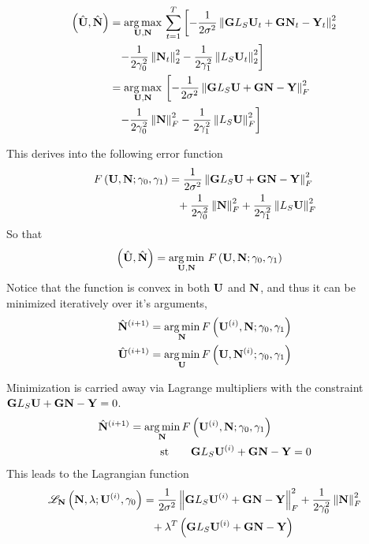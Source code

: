 \documentclass[progressbar=head]{beamer}
\begin{document}
\begin{frame}
\begin{align*}
\left(  \hat{\mathbf{U}}, \hat{\mathbf{N}}  \right) 
&=
    \operatorname*{arg\,max}_{\mathbf{U}, \mathbf{N} }\, \sum_{t=1}^T  \left[
    -\frac{1}{2\sigma^2}
    \left\lVert \mathbf{G} L_S \mathbf{U}_t + \mathbf{G} \mathbf{N}_t - \mathbf{Y}_t \right\rVert_2^2
    \right.
    \\
    &\phantom{=}
    \left.
    -
    \frac{1}{2\gamma_0^2} \left\lVert \mathbf{N}_t \right\rVert_2^2
    -
    \frac{1}{2\gamma_1^2} \left\lVert L_S \mathbf{U}_t \right\rVert_2^2
    \right]
    \\
    &=
    \operatorname*{arg\,max}_{\mathbf{U}, \mathbf{N} }\, \left[
    -\frac{1}{2\sigma^2}
    \left\lVert \mathbf{G} L_S \mathbf{U} + \mathbf{G} \mathbf{N} - \mathbf{Y} \right\rVert_F^2
    \right.
    \\
    &\phantom{=}
    \left.
    -
    \frac{1}{2\gamma_0^2} \left\lVert \mathbf{N} \right\rVert_F^2
    -
    \frac{1}{2\gamma_1^2} \left\lVert L_S \mathbf{U} \right\rVert_F^2
    \right]
\end{align*}
\end{frame}

\begin{frame}
This derives into the following error function
\begin{align*}
    F\left(  {\mathbf{U}}, {\mathbf{N}};  \gamma_0, \gamma_1 \right) &=
    \frac{1}{2\sigma^2}
    \left\lVert \mathbf{G} L_S \mathbf{U} + \mathbf{G} \mathbf{N} - \mathbf{Y} \right\rVert_F^2
    \nonumber \\
    &\phantom{=}
    +
    \frac{1}{2\gamma_0^2} \left\lVert \mathbf{N} \right\rVert_F^2
    +
    \frac{1}{2\gamma_1^2} \left\lVert L_S \mathbf{U} \right\rVert_F^2
\end{align*}
So that
\begin{align*}
\left(  \hat{\mathbf{U}}, \hat{\mathbf{N}}  \right) 
&=
    \operatorname*{arg\,min}_{\mathbf{U}, \mathbf{N} }\, F\left(  {\mathbf{U}}, {\mathbf{N}};  \gamma_0, \gamma_1 \right)
\end{align*}
Notice that the function is convex in both $\mathbf{U}$ and $\mathbf{N}$, and thus it can be minimized iteratively over it's arguments,
    \begin{align*}
        \hat{\mathbf{N}}^{(i+1)} &= \operatorname*{arg\,min}_{\mathbf{N}} F\left( \mathbf{U}^{(i)},\mathbf{N}; \gamma_0, \gamma_1 \right)
        \\
        \hat{\mathbf{U}}^{(i+1)} &= \operatorname*{arg\,min}_{\mathbf{U}} F\left( \mathbf{U},\mathbf{N}^{(i)}; \gamma_0, \gamma_1 \right)
    \end{align*}
\end{frame}

\begin{frame}
Minimization is carried away via Lagrange multipliers with the constraint $\mathbf{G} L_S \mathbf{U} + \mathbf{G} \mathbf{N} - \mathbf{Y}=0$.
\begin{align*}
    \hat{\mathbf{N}}^{(i+1)} &= \operatorname*{arg\,min}_{\mathbf{N}}  F\left( \mathbf{U}^{(i)},\mathbf{N}; \gamma_0, \gamma_1 \right)
    \\
    &\phantom{=}
    \quad \quad
    \text{st} \quad \quad
    \mathbf{G} L_S \mathbf{U}^{(i)} + \mathbf{G} \mathbf{N} - \mathbf{Y}=0
\end{align*}
This leads to the Lagrangian function
\begin{align*}
    \mathscr{L}_{\mathbf{N}} \left( \mathbf{N}, \lambda; \mathbf{U}^{(i)}, \gamma_0 \right)
    &=
    \frac{1}{2\sigma^2}
    \left\lVert \mathbf{G} L_S \mathbf{U}^{(i)} + \mathbf{G} \mathbf{N} - \mathbf{Y} \right\rVert_F^2
    +
    \frac{1}{2\gamma_0^2} \left\lVert \mathbf{N} \right\rVert_F^2
    \\
    &\phantom{=}
    +\lambda^T\left( \mathbf{G} L_S \mathbf{U}^{(i)} + \mathbf{G} \mathbf{N} - \mathbf{Y} \right)
\end{align*}
\end{frame}
\end{document}
